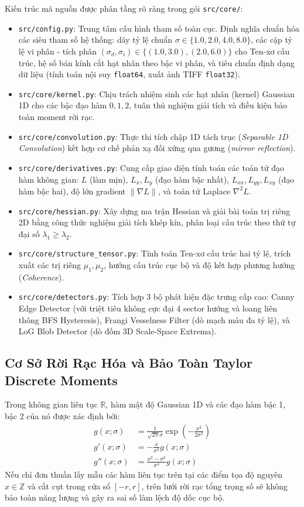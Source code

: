 \documentclass[conference]{IEEEtran}
\begin{document}
Kiến trúc mã nguồn được phân tầng rõ ràng trong gói \texttt{src/core/}:
\begin{itemize}
    \item \texttt{src/config.py}: Trung tâm cấu hình tham số toàn cục. Định nghĩa chuẩn hóa các siêu tham số hệ thống: dãy tỷ lệ chuẩn $\sigma \in \{1.0, 2.0, 4.0, 8.0\}$, các cặp tỷ lệ vi phân - tích phân $(\sigma_d, \sigma_i) \in \{(1.0, 3.0), (2.0, 6.0)\}$ cho Ten-xơ cấu trúc, hệ số bán kính cắt hạt nhân theo bậc vi phân, và tiêu chuẩn định dạng dữ liệu (tính toán nội suy \texttt{float64}, xuất ảnh TIFF \texttt{float32}).
    \item \texttt{src/core/kernel.py}: Chịu trách nhiệm sinh các hạt nhân (kernel) Gaussian 1D cho các bậc đạo hàm $0, 1, 2$, tuân thủ nghiệm giải tích và điều kiện bảo toàn moment rời rạc.
    \item \texttt{src/core/convolution.py}: Thực thi tích chập 1D tách trục (\textit{Separable 1D Convolution}) kết hợp cơ chế phản xạ đối xứng qua gương (\textit{mirror reflection}).
    \item \texttt{src/core/derivatives.py}: Cung cấp giao diện tính toán các toán tử đạo hàm không gian: $L$ (làm mịn), $L_x, L_y$ (đạo hàm bậc nhất), $L_{xx}, L_{yy}, L_{xy}$ (đạo hàm bậc hai), độ lớn gradient $\|\nabla L\|$, và toán tử Laplace $\nabla^2 L$.
    \item \texttt{src/core/hessian.py}: Xây dựng ma trận Hessian và giải bài toán trị riêng 2D bằng công thức nghiệm giải tích khép kín, phân loại cấu trúc theo thứ tự đại số $\lambda_1 \ge \lambda_2$.
    \item \texttt{src/core/structure\_tensor.py}: Tính toán Ten-xơ cấu trúc hai tỷ lệ, trích xuất các trị riêng $\mu_1, \mu_2$, hướng cấu trúc cục bộ và độ kết hợp phương hướng (\textit{Coherence}).
    \item \texttt{src/core/detectors.py}: Tích hợp 3 bộ phát hiện đặc trưng cấp cao: Canny Edge Detector (với triệt tiêu không cực đại 4 sector hướng và loang liên thông BFS Hysteresis), Frangi Vesselness Filter (dò mạch máu đa tỷ lệ), và LoG Blob Detector (dò đốm 3D Scale-Space Extrema).
\end{itemize}

\subsection{Cơ Sở Rời Rạc Hóa và Bảo Toàn Taylor Discrete Moments}
Trong không gian liên tục $\mathbb{R}$, hàm mật độ Gaussian 1D và các đạo hàm bậc 1, bậc 2 của nó được xác định bởi:
\begin{align}
g(x; \sigma) &= \frac{1}{\sqrt{2\pi}\sigma} \exp\left(-\frac{x^2}{2\sigma^2}\right) \label{eq:gauss0} \\
g'(x; \sigma) &= -\frac{x}{\sigma^2} g(x; \sigma) \label{eq:gauss1} \\
g''(x; \sigma) &= \frac{x^2 - \sigma^2}{\sigma^4} g(x; \sigma) \label{eq:gauss2}
\end{align}
Nếu chỉ đơn thuần lấy mẫu các hàm liên tục trên tại các điểm tọa độ nguyên $x \in \mathbb{Z}$ và cắt cụt trong cửa sổ $[-r, r]$, trên lưới rời rạc tổng trọng số sẽ không bảo toàn năng lượng và gây ra sai số làm lệch độ dốc cục bộ.
\end{document}
